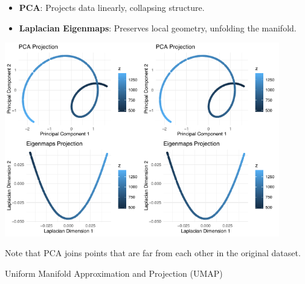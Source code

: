 \documentclass[11pt,handout,aspectratio=169]{beamer}
\begin{document}
\begin{frame}{}
\begin{itemize}
    \item \textbf{PCA}: Projects data linearly, collapsing structure.
    \item \textbf{Laplacian Eigenmaps}: Preserves local geometry, unfolding the manifold.
\end{itemize}
\begin{center}
    \includegraphics[width=0.45\textwidth]{pics/twistedA.pdf}\includegraphics[width=0.45\textwidth]{pics/twistedB.pdf}
\end{center}
Note that PCA joins points that are far from each other in the original dataset.
\end{frame}

\begin{frame}{}
    \begin{center}
        \alert{\Huge Uniform Manifold Approximation and Projection (UMAP)}
    \end{center}
\end{frame}
\end{document}
